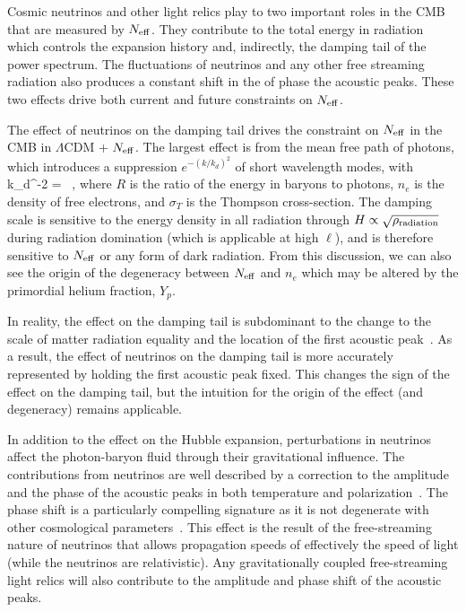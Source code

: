 Cosmic neutrinos and other light relics play to two important roles in the CMB that are measured by $N_{\rm eff}$.  They contribute to the total energy in radiation which controls the expansion history and, indirectly, the damping tail of the power spectrum.  The fluctuations of neutrinos and any other free streaming radiation also produces a constant shift in the of phase the acoustic peaks.  These two effects drive both current and future constraints on $N_{\rm eff}$.  

The effect of neutrinos on the damping tail drives the constraint on $N_{\rm eff}$ in the CMB in $\Lambda$CDM + $N_{\rm eff}$.  The largest effect is from the mean free path of photons, which introduces a suppression $e^{-(k/k_d)^2}$ of short wavelength modes, with~\cite{Zaldarriaga:1995gi}
\beq
k_d^{-2} =\int {}  \ ,
\eeq
where $R$ is the ratio of the energy in baryons to photons, $n_e$ is the density of free electrons, and $\sigma_T$ is the Thompson cross-section.  The damping scale is sensitive to the energy density in all radiation through $H \propto \sqrt{\rho_{\rm radiation}}$ during radiation domination (which is applicable at high $\ell$), and is therefore sensitive to $N_{\rm eff}$ or any form of dark radiation.  From this discussion, we can also see the origin of the degeneracy between $N_{\rm eff}$ and $n_e$ which may be altered by the primordial helium fraction, $Y_p$.

In reality, the effect on the damping tail is subdominant to the change to the scale of matter radiation equality and the location of the first acoustic peak~\cite{Hou:2011ec}.  As a result, the effect of neutrinos on the damping tail is more accurately represented by holding the first acoustic peak fixed.  This changes the sign of the effect on the damping tail, but the intuition for the origin of the effect (and degeneracy) remains applicable.

In addition to the effect on the Hubble expansion, perturbations in neutrinos affect the photon-baryon fluid through their gravitational influence.  The contributions from neutrinos are well described by a correction to the amplitude and the phase of the acoustic peaks in both temperature and polarization~\cite{Bashinsky:2003tk}.  The phase shift is a particularly compelling signature as it is not degenerate with other cosmological parameters~\cite{Bashinsky:2003tk,Baumann:2015rya}.  This effect is the result of the free-streaming nature of neutrinos that allows propagation speeds of effectively the speed of light (while the neutrinos are relativistic).  Any gravitationally coupled free-streaming light relics will also contribute to the amplitude and phase shift of the acoustic peaks.

